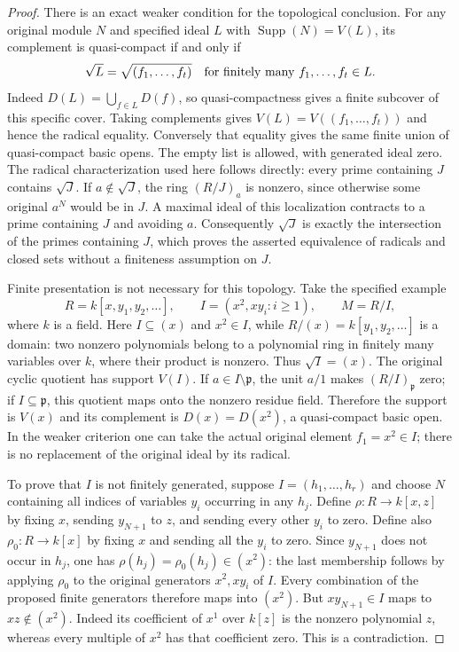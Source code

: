 \begin{proof}
\medskip\noindent
There is an exact weaker condition for the topological
conclusion. For any original module $N$ and specified
ideal $L$ with $\operatorname{Supp}(N)=V(L)$, its
complement is quasi-compact if and only if
$$
\sqrt L=\sqrt{(f_1,\ldots,f_t)}
\quad\hbox{for finitely many }f_1,\ldots,f_t\in L.
$$
Indeed $D(L)=\bigcup_{f\in L}D(f)$, so quasi-compactness
gives a finite subcover of this specific cover. Taking
complements gives $V(L)=V((f_1,\ldots,f_t))$ and hence
the radical equality. Conversely that equality gives the
same finite union of quasi-compact basic opens.
The empty list is allowed, with generated ideal zero.
The radical characterization used here follows directly:
every prime containing $J$ contains $\sqrt J$. If
$a\notin\sqrt J$, the ring $(R/J)_a$ is nonzero, since
otherwise some original $a^N$ would be in $J$.
A maximal ideal of this localization contracts to a prime
containing $J$ and avoiding $a$. Consequently $\sqrt J$
is exactly the intersection of the primes containing $J$,
which proves the asserted equivalence of radicals and
closed sets without a finiteness assumption on $J$.

Finite presentation is not necessary for this topology.
Take the specified example
$$
R=k[x,y_1,y_2,\ldots],\qquad
I=(x^2,xy_i:i\geq1),\qquad M=R/I,
$$
where $k$ is a field. Here $I\subseteq(x)$ and $x^2\in I$,
while $R/(x)=k[y_1,y_2,\ldots]$ is a domain: two
nonzero polynomials belong to a polynomial ring in
finitely many variables over $k$, where their product
is nonzero. Thus $\sqrt I=(x)$.
The original cyclic quotient has support $V(I)$.
If $a\in I\setminus\mathfrak p$, the unit $a/1$
makes $(R/I)_{\mathfrak p}$ zero; if $I\subseteq\mathfrak p$,
this quotient maps onto the nonzero residue field.
Therefore the support is $V(x)$ and its complement
is $D(x)=D(x^2)$, a quasi-compact basic open. In the
weaker criterion one can take the actual original
element $f_1=x^2\in I$; there is no replacement of
the original ideal by its radical.

To prove that $I$ is not finitely generated, suppose
$I=(h_1,\ldots,h_r)$ and choose $N$ containing all
indices of variables $y_i$ occurring in any $h_j$.
Define $\rho:R\to k[x,z]$ by fixing $x$, sending
$y_{N+1}$ to $z$, and sending every other $y_i$ to
zero. Define also $\rho_0:R\to k[x]$ by fixing $x$
and sending all the $y_i$ to zero. Since $y_{N+1}$
does not occur in $h_j$, one has
$\rho(h_j)=\rho_0(h_j)\in(x^2)$: the last membership
follows by applying $\rho_0$ to the original generators
$x^2,xy_i$ of $I$. Every combination of the proposed
finite generators therefore maps into $(x^2)$.
But $xy_{N+1}\in I$ maps to $xz\notin(x^2)$.
Indeed its coefficient of $x^1$ over $k[z]$ is the
nonzero polynomial $z$, whereas every multiple of
$x^2$ has that coefficient zero. This is a contradiction.


\end{proof}
